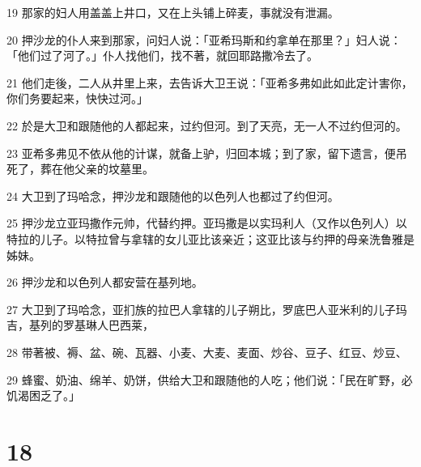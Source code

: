 \par 19 那家的妇人用盖盖上井口，又在上头铺上碎麦，事就没有泄漏。
\par 20 押沙龙的仆人来到那家，问妇人说：「亚希玛斯和约拿单在那里？」妇人说：「他们过了河了。」仆人找他们，找不著，就回耶路撒冷去了。
\par 21 他们走後，二人从井里上来，去告诉大卫王说：「亚希多弗如此如此定计害你，你们务要起来，快快过河。」
\par 22 於是大卫和跟随他的人都起来，过约但河。到了天亮，无一人不过约但河的。
\par 23 亚希多弗见不依从他的计谋，就备上驴，归回本城；到了家，留下遗言，便吊死了，葬在他父亲的坟墓里。
\par 24 大卫到了玛哈念，押沙龙和跟随他的以色列人也都过了约但河。
\par 25 押沙龙立亚玛撒作元帅，代替约押。亚玛撒是以实玛利人（又作以色列人）以特拉的儿子。以特拉曾与拿辖的女儿亚比该亲近；这亚比该与约押的母亲洗鲁雅是姊妹。
\par 26 押沙龙和以色列人都安营在基列地。
\par 27 大卫到了玛哈念，亚扪族的拉巴人拿辖的儿子朔比，罗底巴人亚米利的儿子玛吉，基列的罗基琳人巴西莱，
\par 28 带著被、褥、盆、碗、瓦器、小麦、大麦、麦面、炒谷、豆子、红豆、炒豆、
\par 29 蜂蜜、奶油、绵羊、奶饼，供给大卫和跟随他的人吃；他们说：「民在旷野，必饥渴困乏了。」

\chapter{18}

